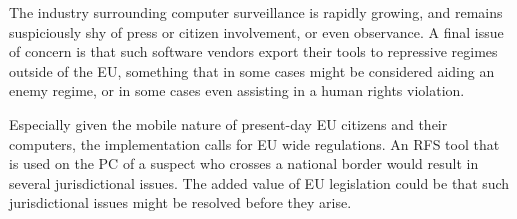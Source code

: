 \documentclass[11pt]{article} %
\begin{document}
The industry surrounding computer surveillance is rapidly growing, and remains suspiciously shy of press or citizen involvement, or even observance.
A final issue of concern is that such software vendors export their tools to repressive regimes outside of the EU, something that in some cases might be considered aiding an enemy regime, or in some cases even assisting in a human rights violation. \cite{guardian}

Especially given the mobile nature of present-day EU citizens and their computers, the implementation calls for EU wide regulations.
An RFS tool that is used on the PC of a suspect who crosses a national border would result in several jurisdictional issues.
The added value of EU legislation could be that such jurisdictional issues might be resolved before they arise.



\end{document}
